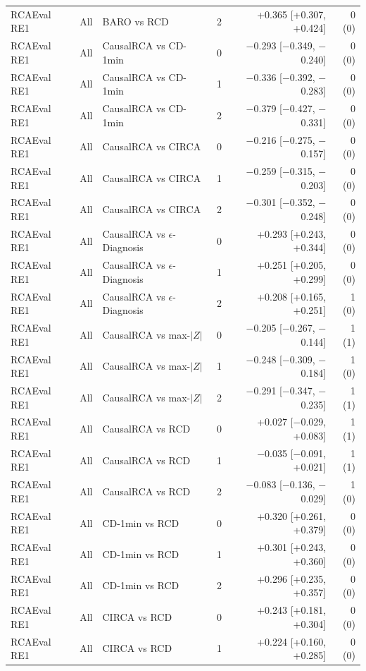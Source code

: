 {\begin{longtable}{llllrr}
RCAEval RE1 & All & BARO vs RCD & 2 & +0.365 [+0.307, +0.424] & 0 (0) \\
RCAEval RE1 & All & CausalRCA vs CD-1min & 0 & $-$0.293 [$-$0.349, $-$0.240] & 0 (0) \\
RCAEval RE1 & All & CausalRCA vs CD-1min & 1 & $-$0.336 [$-$0.392, $-$0.283] & 0 (0) \\
RCAEval RE1 & All & CausalRCA vs CD-1min & 2 & $-$0.379 [$-$0.427, $-$0.331] & 0 (0) \\
RCAEval RE1 & All & CausalRCA vs CIRCA & 0 & $-$0.216 [$-$0.275, $-$0.157] & 0 (0) \\
RCAEval RE1 & All & CausalRCA vs CIRCA & 1 & $-$0.259 [$-$0.315, $-$0.203] & 0 (0) \\
RCAEval RE1 & All & CausalRCA vs CIRCA & 2 & $-$0.301 [$-$0.352, $-$0.248] & 0 (0) \\
RCAEval RE1 & All & CausalRCA vs $\epsilon$-Diagnosis & 0 & +0.293 [+0.243, +0.344] & 0 (0) \\
RCAEval RE1 & All & CausalRCA vs $\epsilon$-Diagnosis & 1 & +0.251 [+0.205, +0.299] & 0 (0) \\
RCAEval RE1 & All & CausalRCA vs $\epsilon$-Diagnosis & 2 & +0.208 [+0.165, +0.251] & 1 (0) \\
RCAEval RE1 & All & CausalRCA vs max-$|Z|$ & 0 & $-$0.205 [$-$0.267, $-$0.144] & 1 (1) \\
RCAEval RE1 & All & CausalRCA vs max-$|Z|$ & 1 & $-$0.248 [$-$0.309, $-$0.184] & 1 (0) \\
RCAEval RE1 & All & CausalRCA vs max-$|Z|$ & 2 & $-$0.291 [$-$0.347, $-$0.235] & 1 (1) \\
RCAEval RE1 & All & CausalRCA vs RCD & 0 & +0.027 [$-$0.029, +0.083] & 1 (1) \\
RCAEval RE1 & All & CausalRCA vs RCD & 1 & $-$0.035 [$-$0.091, +0.021] & 1 (1) \\
RCAEval RE1 & All & CausalRCA vs RCD & 2 & $-$0.083 [$-$0.136, $-$0.029] & 1 (0) \\
RCAEval RE1 & All & CD-1min vs RCD & 0 & +0.320 [+0.261, +0.379] & 0 (0) \\
RCAEval RE1 & All & CD-1min vs RCD & 1 & +0.301 [+0.243, +0.360] & 0 (0) \\
RCAEval RE1 & All & CD-1min vs RCD & 2 & +0.296 [+0.235, +0.357] & 0 (0) \\
RCAEval RE1 & All & CIRCA vs RCD & 0 & +0.243 [+0.181, +0.304] & 0 (0) \\
RCAEval RE1 & All & CIRCA vs RCD & 1 & +0.224 [+0.160, +0.285] & 0 (0) \\

\end{longtable}}
